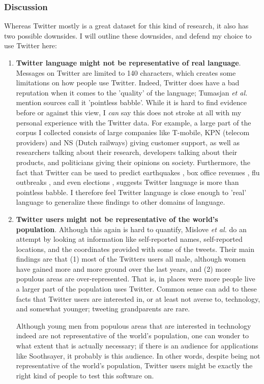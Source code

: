 \documentclass[11pt]{article}
\begin{document}
\subsubsection{Discussion}
Whereas Twitter mostly is a great dataset for this kind of research, it also has two possible downsides. I will outline these downsides, and defend my choice to use Twitter here:

\begin{enumerate}

\item \textbf{Twitter language might not be representative of real language}. Messages on Twitter are limited to 140 characters, which creates some limitations on how people use Twitter. Indeed, Twitter does have a bad reputation when it comes to the 'quality' of the language; Tumasjan {\em et al.}  mention sources call it 'pointless babble'. While it is hard to find evidence before or against this view, I \emph{can} say this does not stroke at all with my personal experience with the Twitter data. For example, a large part of the corpus I collected consists of large companies like T-mobile, KPN (telecom providers) and NS (Dutch railways) giving customer support, as well as researchers talking about their research, developers talking about their products, and politicians giving their opinions on society. Furthermore, the fact that Twitter can be used to predict earthquakes , box office revenues \cite{asur+10}, flu outbreaks \cite{lampos+10}, and even elections \cite{tumasjan+10}, suggests Twitter language is more than pointless babble. I therefore feel Twitter language is close enough to 'real' language to generalize these findings to other domains of language.

\item \textbf{Twitter users might not be representative of the world's population}. Although this again is hard to quantify, Mislove {\em et al.}  do an attempt by looking at information like self-reported names, self-reported locations, and the coordinates provided with some of the tweets. Their main findings are that (1) most of the Twitters users all male, although women have gained more and more ground over the last years, and (2) more populous areas are over-represented. That is, in places were more people live a larger part of the population uses Twitter. Common sense can add to these facts that Twitter users are interested in, or at least not averse to, technology, and somewhat younger; tweeting grandparents are rare. 

Although young men from populous areas that are interested in technology indeed are not representative of the world's population, one can wonder to what extent that is actually necessary; if there is an audience for applications like Soothsayer, it probably is this audience. In other words, despite being not representative of the world's population, Twitter users might be exactly the right kind of people to test this software on.

\end{enumerate}
\end{document}
